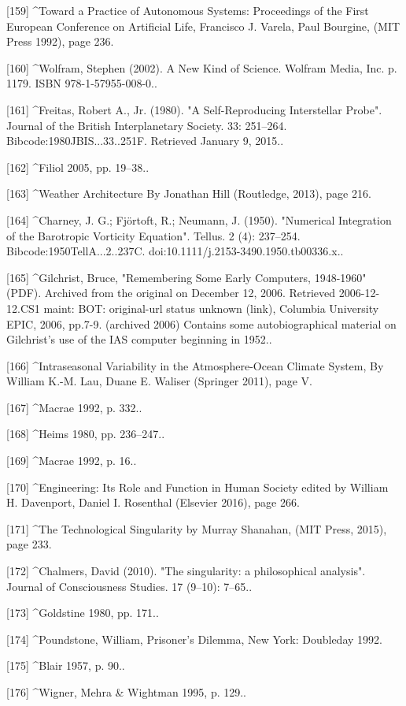 [159]
^Toward a Practice of Autonomous Systems: Proceedings of the First European Conference on Artificial Life, Francisco J. Varela, Paul Bourgine, (MIT Press 1992), page 236.

[160]
^Wolfram, Stephen (2002). A New Kind of Science. Wolfram Media, Inc. p. 1179. ISBN 978-1-57955-008-0..

[161]
^Freitas, Robert A., Jr. (1980). "A Self-Reproducing Interstellar Probe". Journal of the British Interplanetary Society. 33: 251–264. Bibcode:1980JBIS...33..251F. Retrieved January 9, 2015..

[162]
^Filiol 2005, pp. 19–38..

[163]
^Weather Architecture By Jonathan Hill (Routledge, 2013), page 216.

[164]
^Charney, J. G.; Fjörtoft, R.; Neumann, J. (1950). "Numerical Integration of the Barotropic Vorticity Equation". Tellus. 2 (4): 237–254. Bibcode:1950TellA...2..237C. doi:10.1111/j.2153-3490.1950.tb00336.x..

[165]
^Gilchrist, Bruce, "Remembering Some Early Computers, 1948-1960" (PDF). Archived from the original on December 12, 2006. Retrieved 2006-12-12.CS1 maint: BOT: original-url status unknown (link), Columbia University EPIC, 2006, pp.7-9. (archived 2006) Contains some autobiographical material on Gilchrist's use of the IAS computer beginning in 1952..

[166]
^Intraseasonal Variability in the Atmosphere-Ocean Climate System, By William K.-M. Lau, Duane E. Waliser (Springer 2011), page V.

[167]
^Macrae 1992, p. 332..

[168]
^Heims 1980, pp. 236–247..

[169]
^Macrae 1992, p. 16..

[170]
^Engineering: Its Role and Function in Human Society edited by William H. Davenport, Daniel I. Rosenthal (Elsevier 2016), page 266.

[171]
^The Technological Singularity by Murray Shanahan, (MIT Press, 2015), page 233.

[172]
^Chalmers, David (2010). "The singularity: a philosophical analysis". Journal of Consciousness Studies. 17 (9–10): 7–65..

[173]
^Goldstine 1980, pp. 171..

[174]
^Poundstone, William, Prisoner's Dilemma, New York: Doubleday 1992.

[175]
^Blair 1957, p. 90..

[176]
^Wigner, Mehra & Wightman 1995, p. 129..

